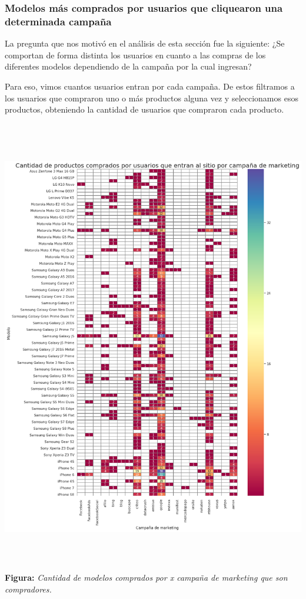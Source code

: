 \documentclass[titlepage,a4paper]{article}
\begin{document}
  \subsubsection{Modelos más comprados por usuarios que cliquearon una determinada campaña}

	La pregunta que nos motivó en el análisis de esta sección fue la siguiente: ¿Se comportan de forma distinta los usuarios en cuanto a las compras de los diferentes modelos dependiendo de la campaña por la cual ingresan?

	Para eso, vimos cuantos usuarios entran por cada campaña. De estos filtramos a los usuarios que compraron uno o más productos alguna vez y seleccionamos esos productos, obteniendo la cantidad de usuarios que compraron cada producto.
	
		
	\begin{center}
   \includegraphics[width=14cm, height=20cm]{modelosCamp.png}\\
	\textbf{Figura:}  \textit{Cantidad de modelos comprados por \textit{x} campaña de marketing que son compradores.}
	\end{center}
	
\end{document}
